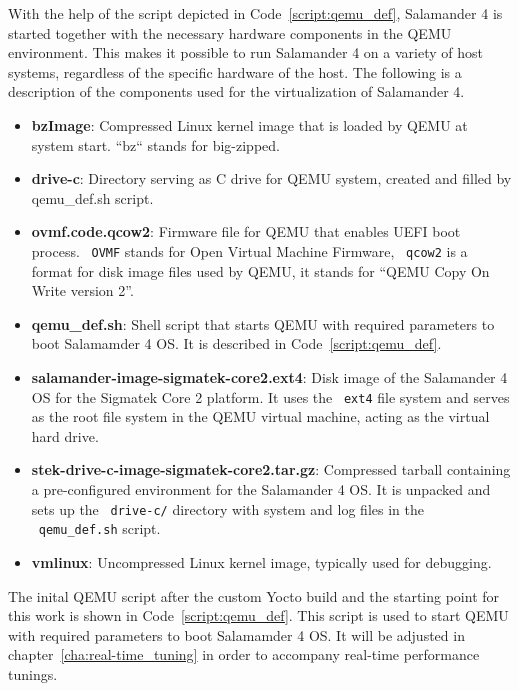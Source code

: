 \documentclass[MMR,Master,english]{twbook}
\begin{document}
\noindent With the help of the script depicted in Code~\ref{script:qemu_def}, Salamander 4 is started together with the necessary hardware components in the QEMU environment. This makes it possible to run Salamander 4 on a variety of host systems, regardless of the specific hardware of the host. The following is a description of the components used for the virtualization of Salamander 4.
\clearpage
\begin{itemize}
	\item \textbf{bzImage}: Compressed Linux kernel image that is loaded by QEMU at system start. ``bz`` stands for big-zipped.
	\item \textbf{drive-c}: Directory serving as C drive for QEMU system, created and filled by qemu\_def.sh script.
	\item \textbf{ovmf.code.qcow2}: Firmware file for QEMU that enables UEFI boot process. ~\texttt{OVMF} stands for Open Virtual Machine Firmware, ~\texttt{qcow2} is a format for disk image files used by QEMU, it stands for ``QEMU Copy On Write version 2''.
	\item \textbf{qemu\_def.sh}: Shell script that starts QEMU with required parameters to boot Salamamder 4 OS. It is described in Code~\ref{script:qemu_def}.
	\item \textbf{salamander-image-sigmatek-core2.ext4}: Disk image of the Salamander 4 OS for the Sigmatek Core 2 platform. It uses the ~\texttt{ext4} file system and serves as the root file system in the QEMU virtual machine, acting as the virtual hard drive.
	\item \textbf{stek-drive-c-image-sigmatek-core2.tar.gz}: Compressed tarball containing a pre-configured environment for the Salamander 4 OS. It is unpacked and sets up the ~\texttt{drive-c/} directory with system and log files in the ~\texttt{qemu\_def.sh} script. 
	\item \textbf{vmlinux}: Uncompressed Linux kernel image, typically used for debugging.
\end{itemize}

\noindent The inital QEMU script after the custom Yocto build and the starting point for this work is shown in Code~\ref{script:qemu_def}. This script is used to start QEMU with required parameters to boot Salamamder 4 OS. It will be adjusted in chapter~\ref{cha:real-time_tuning} in order to accompany real-time performance tunings. 
\end{document}
